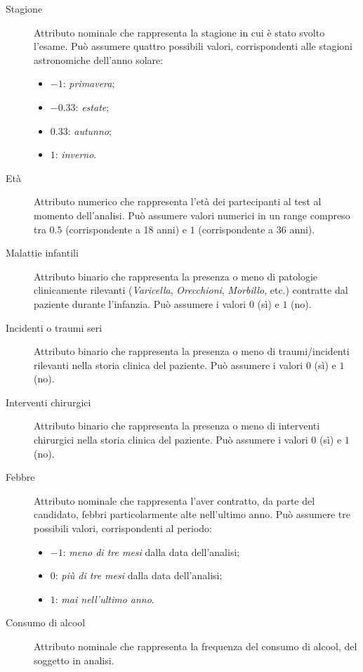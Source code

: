 \begin{description}
  \item[Stagione]
    Attributo nominale che rappresenta la stagione in cui è stato svolto l'esame.
    Può assumere quattro possibili valori, corrispondenti alle stagioni astronomiche dell'anno solare:
    \begin{itemize}
      \item \(-1\): \emph{primavera};
      \item \(-0.33\): \emph{estate};
      \item \(0.33\): \emph{autunno};
      \item \(1\): \emph{inverno}.
    \end{itemize}
  \item[Età]
    Attributo numerico che rappresenta l'età dei partecipanti al test al momento dell'analisi.
    Può assumere valori numerici in un range compreso tra \(0.5\) (corrispondente a 18 anni) e \(1\) (corrispondente a 36 anni).
  \item[Malattie infantili]
    Attributo binario che rappresenta la presenza o meno di patologie clinicamente rilevanti (\emph{Varicella}, \emph{Orecchioni}, \emph{Morbillo}, etc.) contratte dal paziente durante l'infanzia.
    Può assumere i valori \(0\) (sì) e \(1\) (no).
  \item[Incidenti o traumi seri]
    Attributo binario che rappresenta la presenza o meno di traumi/incidenti rilevanti nella storia clinica del paziente.
    Può assumere i valori \(0\) (sì) e \(1\) (no).
  \item[Interventi chirurgici]
    Attributo binario che rappresenta la presenza o meno di interventi chirurgici nella storia clinica del paziente.
    Può assumere i valori \(0\) (sì) e \(1\) (no).
  \item[Febbre]
    Attributo nominale che rappresenta l'aver contratto, da parte del candidato, febbri particolarmente alte nell'ultimo anno.
    Può assumere tre possibili valori, corrispondenti al periodo:
    \begin{itemize}
      \item \(-1\): \emph{meno di tre mesi} dalla data dell'analisi;
      \item \(0\): \emph{più di tre mesi} dalla data dell'analisi;
      \item \(1\): \emph{mai nell'ultimo anno}.
    \end{itemize}
  \item[Consumo di alcool]
    Attributo nominale che rappresenta la frequenza del consumo di alcool, del soggetto in analisi.

\end{description}
